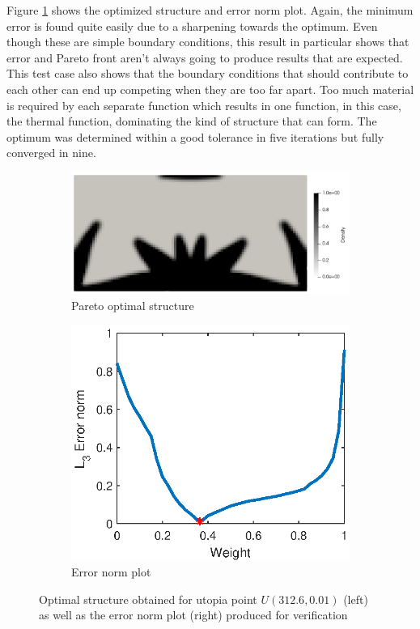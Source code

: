 Figure \ref{fig:test_case_two_pareto_optimum} shows the optimized structure and error norm plot. Again, the minimum error is found quite easily due to a sharpening towards the optimum. Even though these are simple boundary conditions, this result in particular shows that error and Pareto front aren't always going to produce results that are expected. This test case also shows that the boundary conditions that should contribute to each other can end up competing when they are too far apart. Too much material is required by each separate function which results in one function, in this case, the thermal function, dominating the kind of structure that can form. The optimum was determined within a good tolerance in five iterations but fully converged in nine.
\begin{figure}[ht]
    \centering
    \hfill
    \begin{subfigure}[b]{0.45\linewidth}
        \includegraphics[width=\linewidth]{figures/chapter_6/Case2_ParetoOptimum.png}
        \caption{Pareto optimal structure}
    \end{subfigure}
    \hfill
    \begin{subfigure}[b]{0.25\linewidth}
        \includegraphics[width=\linewidth]{figures/chapter_6/Case2_ErrorNormPlot.eps}
        \caption{Error norm plot}
    \end{subfigure}
    \hfill
    \caption{Optimal structure obtained for utopia point $U(312.6,0.01)$ (left) as well as the error norm plot (right) produced for verification}
    \label{fig:test_case_two_pareto_optimum}
\end{figure}


